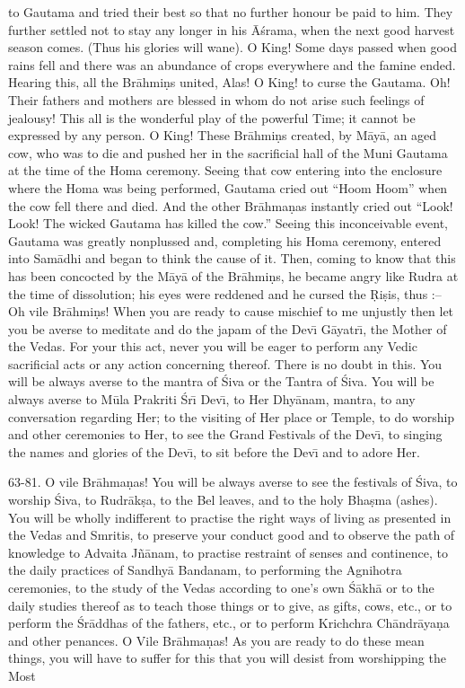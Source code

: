 to Gautama and tried their best so that no further honour be paid to him. They further settled not to stay any longer in his \=A\'srama, when the next good harvest season comes. (Thus his glories will wane). O King! Some days passed when good rains fell and there was an abundance of crops everywhere and the famine ended. Hearing this, all the Br\=ahmi\d{n}s united, Alas! O King! to curse the Gautama. Oh! Their fathers and mothers are blessed in whom do not arise such feelings of jealousy! This all is the wonderful play of the powerful Time; it cannot be expressed by any person. O King! These Br\=ahmi\d{n}s created, by M\=ay\=a, an aged cow, who was to die and pushed her in the sacrificial hall of the Muni Gautama at the time of the Homa ceremony. Seeing that cow entering into the enclosure where the Homa was being performed, Gautama cried out ``Hoom Hoom'' when the cow fell there and died. And the other Br\=ahma\d{n}as instantly cried out ``Look! Look! The wicked Gautama has killed the cow.'' Seeing this inconceivable event, Gautama was greatly nonplussed and, completing his Homa ceremony, entered into Sam\=adhi and began to think the cause of it. Then, coming to know that this has been concocted by the M\=ay\=a of the Br\=ahmi\d{n}s, he became angry like Rudra at the time of dissolution; his eyes were reddened and he cursed the \d{R}i\d{s}is, thus :-- Oh vile Br\=ahmi\d{n}s! When you are ready to cause mischief to me unjustly then let you be averse to meditate and do the japam of the Dev\={\i} G\=ayatr\={\i}, the Mother of the Vedas. For your this act, never you will be eager to perform any Vedic sacrificial acts or any action concerning thereof. There is no doubt in this. You will be always averse to the mantra of \'Siva or the Tantra of \'Siva. You will be always averse to M\=ula Prakriti \'Sr\={\i} Dev\={\i}, to Her Dhy\=anam, mantra, to any conversation regarding Her; to the visiting of Her place or Temple, to do worship and other ceremonies to Her, to see the Grand Festivals of the Dev\={\i}, to singing the names and glories of the Dev\={\i}, to sit before the Dev\={\i} and to adore Her.

63-81. O vile Br\=ahma\d{n}as! You will be always averse to see the festivals of \'Siva, to worship \'Siva, to Rudr\=ak\d{s}a, to the Bel leaves, and to the holy Bha\d{s}ma (ashes). You will be wholly indifferent to practise the right ways of living as presented in the Vedas and Smritis, to preserve your conduct good and to observe the path of knowledge to Advaita J\~n\=anam, to practise restraint of senses and continence, to the daily practices of Sandhy\=a Bandanam, to performing the Agnihotra ceremonies, to the study of the Vedas according to one's own \'S\=akh\=a or to the daily studies thereof as to teach those things or to give, as gifts, cows, etc., or to perform the \'Sr\=addhas of the fathers, etc., or to perform Krichchra Ch\=andr\=aya\d{n}a and other penances. O Vile Br\=ahma\d{n}as! As you are ready to do these mean things, you will have to suffer for this that you will desist from worshipping the Most

